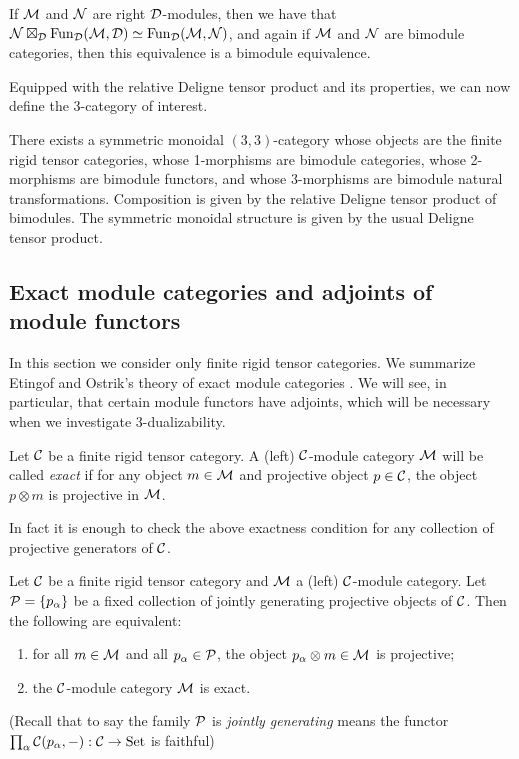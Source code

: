 \documentclass{amsart}
\begin{document}
\begin{remark} \label{remark-tensorasfunctors}
If $\mathcal M$ and $\mathcal N$ are right $\mathcal D$-modules, then we have that $\mathcal N \boxtimes_\mathcal D \operatorname{Fun}_{\mathcal D}(\mathcal M,\mathcal D) \simeq \operatorname{Fun}_{\mathcal D}(\mathcal M,\mathcal N)$, and again if $\mathcal M$ and $\mathcal N$ are bimodule categories, then this equivalence is a bimodule equivalence. 
\end{remark}



Equipped with the relative Deligne tensor product and its properties, we can now define the 3-category of interest.

\begin{theorem}[ \cite{3TC}]
	There exists a symmetric monoidal $(3,3)$-category whose objects are the finite rigid tensor categories, whose 1-morphisms are bimodule categories, whose 2-morphisms are bimodule functors, and whose 3-morphisms are bimodule natural transformations. Composition is given by the relative Deligne tensor product of bimodules. The symmetric monoidal structure is given by the usual Deligne tensor product. 
\end{theorem}

\subsection{Exact module categories and adjoints of module functors} \label{sec:tc-exact}
In this section we consider only finite rigid tensor categories.  We summarize Etingof and Ostrik's theory of exact module categories \cite{MR2119143}.  We will see, in particular, that certain module functors have adjoints, which will be necessary when we investigate $3$-dualizability.

\begin{definition}
	Let $\mathcal C$ be a finite rigid tensor category. A (left) $\mathcal C$-module category $\mathcal M$ will be called {\em exact} if for any object $m \in \mathcal M$ and  projective object $p \in \mathcal C$, the object $p \otimes m$ is projective in $\mathcal M$. 
\end{definition}

\noindent In fact it is enough to check the above exactness condition for any collection of projective generators of $\mathcal C$. 

\begin{lemma} \label{lma:Exact_checked_on_proj_gens}
	Let $\mathcal C$ be a finite rigid tensor category and $\mathcal M$ a (left) $\mathcal C$-module category. Let $\mathcal P = \{ p_\alpha \}$ be a fixed collection of jointly generating projective objects of  $\mathcal C$. Then the following are equivalent:
	\begin{enumerate}
		\item for all $m \in \mathcal M$ and all $p_\alpha \in \mathcal P$, the object $p_\alpha \otimes m \in \mathcal M$ is projective;
		\item the $\mathcal C$-module category $\mathcal M$ is exact.
	\end{enumerate}
	(Recall that to say the family $\mathcal P$ is {\em jointly generating} means the functor $\prod_\alpha\mathcal C(p_\alpha, -): \mathcal C \to \mathrm{Set}$ is faithful)
\end{lemma}
\end{document}

